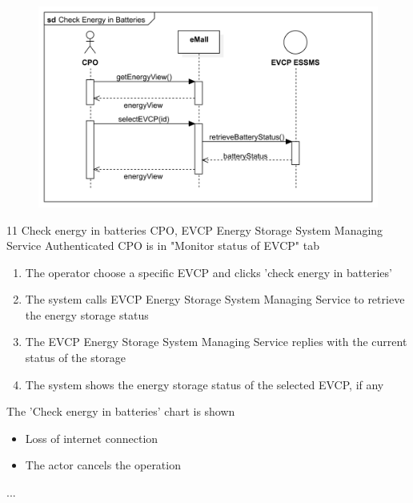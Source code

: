 \usecase
{
    \begin{figure}[H]
        \centering
        \includegraphics[scale=0.9]{src/sequence_diagram/checkEnergy.png}
    \end{figure}
}
{11}
{Check energy in batteries} %
{CPO, EVCP Energy Storage System Managing Service} %
{Authenticated CPO is in "Monitor status of EVCP" tab} %
{ %
    \begin{enumerate}
        \item The operator choose a specific EVCP and clicks 'check energy in batteries'
        \item The system calls EVCP Energy Storage System Managing Service to retrieve the energy storage status
        \item The EVCP Energy Storage System Managing Service replies with the current status of the storage
        \item The system shows the energy storage status of the selected EVCP, if any
    \end{enumerate}
}
{The 'Check energy in batteries' chart is shown} %
{ %
    \begin{itemize}
        \item Loss of internet connection
        \item The actor cancels the operation
    \end{itemize}
}
{ %
    ...
}


